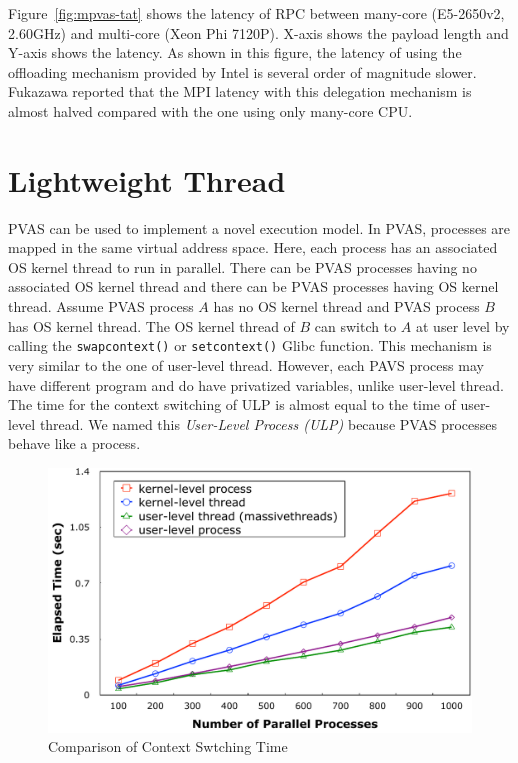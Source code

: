 Figure~\ref{fig:mpvas-tat} shows the latency of RPC between many-core
(E5-2650v2, 2.60GHz) and multi-core (Xeon Phi 7120P). X-axis shows the
payload length and Y-axis shows the latency. As shown in this figure,
the latency of using the offloading mechanism provided by Intel is
several order of magnitude slower. Fukazawa reported that the MPI
latency with this delegation mechanism is almost halved compared with
the one using only many-core 
CPU\cite{Sato:2014:DMP:2642769.2642795,fukazawa-thesis}. 

\section{Lightweight Thread}

PVAS can be used to implement a novel execution model. In PVAS,
processes are mapped in the same virtual address space. Here, each
process has an associated OS kernel thread to run in parallel. There
can be PVAS processes having no associated OS kernel thread and there
can be PVAS processes having OS kernel thread. Assume PVAS process $A$
has no OS kernel thread and PVAS process $B$ has OS kernel thread. The
OS kernel thread of $B$ can switch to $A$ at user level by calling
the {\tt swapcontext()} or {\tt setcontext()} Glibc function. This
mechanism is very similar to the one of user-level thread. However,
each PAVS process may have different program and do have privatized
variables, unlike user-level thread. The time for the context
switching of ULP is almost equal to the time of user-level thread. 
We named this {\em User-Level Process (ULP)}
because PVAS processes behave like a process\cite{110009850784}.

\begin{figure}[ht]
\begin{center}
\includegraphics[width=0.8\columnwidth]{Figs/ULP-CTXSW.pdf}
  \caption{Comparison of Context Swtching Time}
  \label{fig:ulp-ctxsw}
\end{center}
\end{figure}

